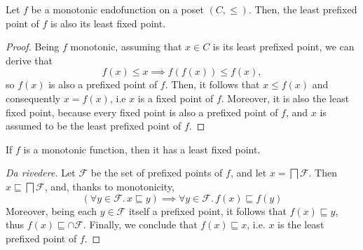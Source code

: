 \begin{lem}
  Let \(f\) be a monotonic endofunction on a poset \((C,\le)\).
  Then, the least prefixed point of \(f\) is also its least fixed point.
\end{lem}
\begin{proof}
  Being \(f\) monotonic, assuming that \(x \in C\) is its least prefixed point, we can derive that
  \begin{equation*}
    f(x) \le x \implies f(f(x)) \le f(x),
  \end{equation*}
  so \(f(x)\) is also a prefixed point of \(f\).
  Then, it follows that \(x \le f(x)\) and consequently \(x = f(x)\), i.e \(x\) is a fixed point of \(f\).
  Moreover, it is also the least fixed point, because every fixed point is also a prefixed point of \(f\), and \(x\) is assumed to be the least prefixed point of \(f\).  
\end{proof}

\begin{thm}
  If \(f\) is a monotonic function, then it has a least fixed point.
\end{thm}
\begin{proof}[Da rivedere]
  Let \(\mathcal{F}\) be the set of prefixed points of \(f\), and let \(x = \bigsqcap\mathcal{F}\). Then \(x \sqsubseteq \bigsqcap\mathcal{F}\), and, thanks to monotonicity,
  \begin{equation*}
    \left(\forall y \in \mathcal{F}.\, x \sqsubseteq y\right) \implies \forall y \in \mathcal{F}.\,f(x) \sqsubseteq f(y)
  \end{equation*}
  Moreover, being each \(y \in \mathcal{F}\) itself a prefixed point, it follows that \(f(x) \sqsubseteq y\), thus \(f(x) \sqsubseteq \cap\mathcal{F}\).
  Finally, we conclude that \(f(x) \sqsubseteq x\), i.e. \(x\) is the least prefixed point of \(f\).
\end{proof}

